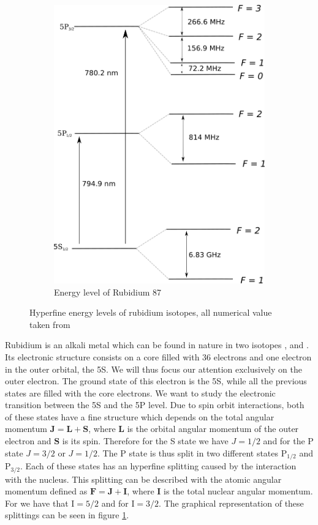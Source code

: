 \documentclass[a4paper,10pt]{article}
\begin{document}
\begin{figure}[H]
\begin{subfigure}[b]{0.49\textwidth}
        \includegraphics[width=\textwidth]{rubidium87}
        \caption{Energy level of Rubidium 87}
    \end{subfigure}
\caption{Hyperfine energy levels of rubidium isotopes, all numerical value taken from \cite{rubidium87data}}\label{rubidium}
\end{figure}
Rubidium is an alkali metal which can be found in nature in two isotopes , and . Its electronic structure consists on a core filled with 36 electrons and one electron in the outer orbital, the 5S. We will thus focus our attention exclusively on the outer electron. The ground state of this electron is the 5S, while all the previous states are filled with the core electrons. We want to study the electronic transition between the 5S and the 5P level. Due to spin orbit interactions, both of these states have a fine structure which depends on the total angular momentum $\mathbf{J} = \mathbf{L}+\mathbf{S}$, where $\mathbf{L}$ is the orbital angular momentum of the outer electron and $\mathbf{S}$ is its spin. Therefore for the S state we have $J=1/2$ and for the P state $J=3/2$ or $J=1/2$. The P state is thus split in two different states $\text{P}_{1/2}$ and $\text{P}_{3/2}$. Each of these states has an hyperfine splitting caused by the interaction with the nucleus. This splitting can be described with the atomic angular momentum defined as $\mathbf{F} = \mathbf{J} + \mathbf{I}$, where $\mathbf{I}$ is the total nuclear angular momentum. For  we have that $\text{I} = 5/2$ and for  $\text{I}=3/2$. The graphical representation of these splittings can be seen in figure \ref{rubidium}.\\
\end{document}
